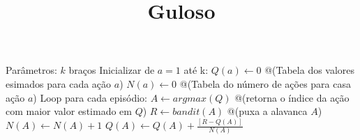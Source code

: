 \documentclass[brazilian,preview]{standalone}
\title{Guloso}
\begin{document}
\begin{algorithm}
Parâmetros: $k$ braços
Inicializar de $a=1$ até k:
    $Q(a) \leftarrow 0$ @\hfill@ (Tabela dos valores esimados para cada ação $a$)
    $N(a) \leftarrow 0$ @\hfill@ (Tabela do número de ações para casa ação $a$)
Loop para cada episódio:
    $A \leftarrow argmax(Q)$ @\hfill@ (retorna o índice da ação com maior valor estimado em $Q$)
    $R \leftarrow bandit(A)$ @\hfill@ (puxa a alavanca $A$)
    $N(A) \leftarrow N(A) + 1$
    $Q(A) \leftarrow Q(A) + \frac{[R - Q(A)]}{N(A)}$
\end{algorithm}
\end{document}
